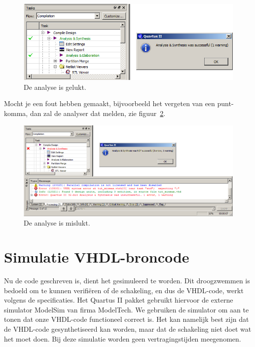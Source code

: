 \documentclass[a4paper,12pt,fleqn,twoside]{book}
\def\tutpicscale{0.455}
\begin{document}
\begin{figure}[H]
\centering
\includegraphics[scale=\tutpicscale]{081succesfull.png}
\caption{De analyse is gelukt.}
\label{fig:081succesfull}
\end{figure}

Mocht je een fout hebben gemaakt, bijvoorbeeld het vergeten van een punt-komma,
dan zal de analyser dat melden, zie figuur~\ref{fig:075notsuccessfull}.

\begin{figure}[H]
\centering
\includegraphics[scale=\tutpicscale]{075notsuccessfull.png}
\caption{De analyse is mislukt.}
\label{fig:075notsuccessfull}
\end{figure}

\section{Simulatie VHDL-broncode}
\label{sec:simulatievhdlbroncode}
Nu de code geschreven is, dient het gesimuleerd te worden. Dit droogzwemmen is
bedoeld om te kunnen verifi\"{e}ren of de schakeling, en dus de VHDL-code,
werkt volgens de specificaties. Het Quartus II pakket gebruikt hiervoor de
externe simulator ModelSim van firma ModelTech. We gebruiken de simulator om
aan te tonen dat onze VHDL-code functioneel correct is. Het kan namelijk best
zijn dat de VHDL-code gesynthetiseerd kan worden, maar dat de schakeling niet 
doet wat het moet doen. Bij deze simulatie worden geen vertragingstijden
meegenomen.
\end{document}
